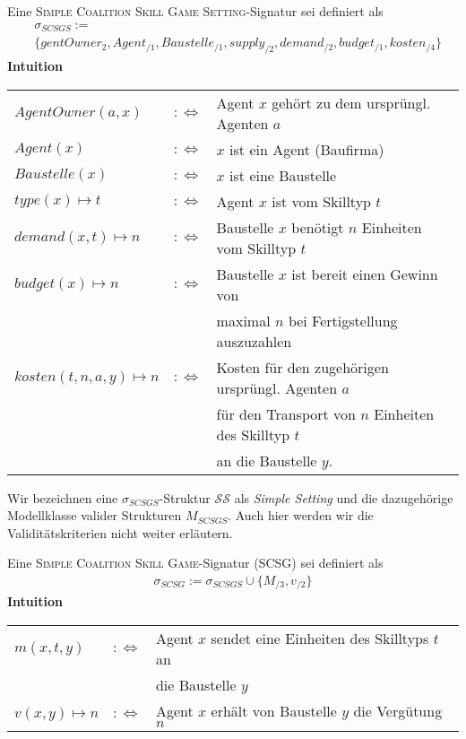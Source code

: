 \documentclass[sigconf]{acmart}
\theoremstyle{break}
\begin{document}
\begin{definition}[SCSGS]
  Eine \textsc{Simple Coalition Skill Game Setting}-Signatur sei definiert als
  \begin{align*}
    &\sigma_{SCSGS}:= \\
    &\{gentOwner_{2}, Agent_{/1}, Baustelle_{/1}, supply_{/2}, demand_{/2}, budget_{/1}, kosten_{/4} \}
  \end{align*}
  \noindent
  \textbf{Intuition} \\
    \begin{tabular}{lrl}
    $AgentOwner(a, x)$&$:\Leftrightarrow$& Agent $x$ gehört zu dem ursprüngl. Agenten $a$ \\
    $Agent(x)$&$:\Leftrightarrow$& $x$ ist ein Agent (Baufirma) \\
    $Baustelle(x) $&$:\Leftrightarrow$& $x$ ist eine Baustelle \\
    $type(x)\mapsto t $&$:\Leftrightarrow$& Agent $x$ ist vom Skilltyp $t$ \\
    $demand(x, t)\mapsto n $&$:\Leftrightarrow$& Baustelle $x$ benötigt $n$ Einheiten vom Skilltyp $t$ \\
    $budget(x)\mapsto n $&$:\Leftrightarrow$&
    Baustelle $x$ ist bereit einen Gewinn von \\&&maximal $n$ bei Fertigstellung auszuzahlen\\
    $kosten(t, n, a, y)\mapsto n$&$:\Leftrightarrow$& Kosten für den zugehörigen ursprüngl. Agenten $a$ \\&& für den Transport von $n$ Einheiten des Skilltyp $t$ \\&& an die Baustelle $y$.
    \end{tabular}
\end{definition}

\noindent
Wir bezeichnen eine $\sigma_{SCSGS}$-Struktur $\mathcal{SS}$ als \textit{Simple Setting} und die dazugehörige Modellklasse valider Strukturen $M_{SCSGS}$. Auch hier werden wir die Validitätskriterien nicht weiter erläutern.

\begin{definition}[SCSG]
  Eine \textsc{Simple Coalition Skill Game}-Signatur (SCSG) sei definiert als
  \begin{align*}
    \sigma_{SCSG}:=\sigma_{SCSGS}\cup\{M_{/3}, v_{/2}\}
  \end{align*}
  \noindent
  \textbf{Intuition} \\
    \begin{tabular}{lrl}
    $m(x, t, y)$&$:\Leftrightarrow$& Agent $x$ sendet eine Einheiten des Skilltyps $t$ an \\&&die Baustelle $y$ \\
    $v(x,y)\mapsto n$&$:\Leftrightarrow$& Agent $x$ erhält von Baustelle $y$ die Vergütung $n$
    \end{tabular}
\end{definition}
\end{document}
